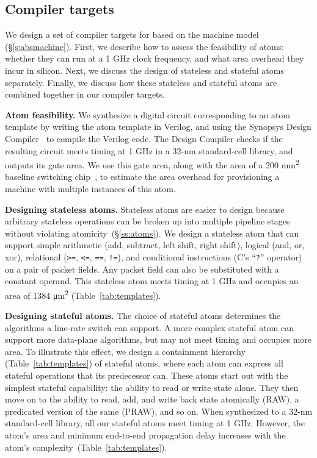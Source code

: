 \subsection{Compiler targets}
\label{ss:targets}

We design a set of compiler targets for \pktlanguage based on the
\absmachine machine model (\S\ref{s:absmachine}). First, we describe how to
assess the feasibility of atoms: whether they can run at a 1 GHz clock
frequency, and what area overhead they incur in silicon. Next, we discuss the
design of stateless and stateful atoms separately. Finally, we discuss how
these stateless and stateful atoms are combined together in our compiler
targets.

\medskip
\noindent
\textbf{Atom feasibility.}
We synthesize a digital circuit corresponding to an atom template by
writing the atom template in Verilog, and using the Synopsys Design
Compiler~\cite{synopsys_dc} to compile the Verilog code. The Design Compiler checks
if the resulting circuit meets timing at 1 GHz in a 32-nm
standard-cell library, and outputs its gate area. We use this gate area,
along with the area of a 200 \si{\milli\metre\squared}
baseline switching chip~\cite{gibb_parsing}, to estimate the area overhead for provisioning a
\absmachine machine with multiple instances of this atom.


\medskip
\noindent
\textbf{Designing stateless atoms.}
Stateless atoms are easier to design because arbitrary stateless operations can
be broken up into multiple pipeline stages without violating
atomicity~(\S\ref{ss:atoms}). We design a stateless atom that can support
simple arithmetic (add, subtract, left shift, right shift), logical (and, or,
xor), relational ({\tt >=}, {\tt <=}, {\tt ==}, {\tt !=}), and conditional
instructions (C's ``{\tt ?}'' operator) on a pair of packet fields. Any packet
field can also be substituted with a constant operand. This stateless atom
meets timing at 1 GHz and occupies an area of 1384 \si{\micro\meter\squared}
(Table~\ref{tab:templates}).

\medskip
\noindent
\textbf{Designing stateful atoms.}
The choice of stateful atoms determines the algorithms a line-rate switch can
support. A more complex stateful atom can support more data-plane algorithms,
but may not meet timing and occupies more area. To illustrate this effect, we
design a containment hierarchy (Table~\ref{tab:templates}) of stateful atoms,
where each atom can express all stateful operations that its predecessor can.
These atoms start out with the simplest stateful capability: the ability to
read or write state alone.  They then move on to the ability to read, add, and
write back state atomically (RAW), a predicated version of the same (PRAW), and
so on. When synthesized to a 32-nm standard-cell library, all our stateful
atoms meet timing at 1 GHz.  However, the atom's area and minimum end-to-end
propagation delay increases with the atom's
complexity~(Table~\ref{tab:templates}).

